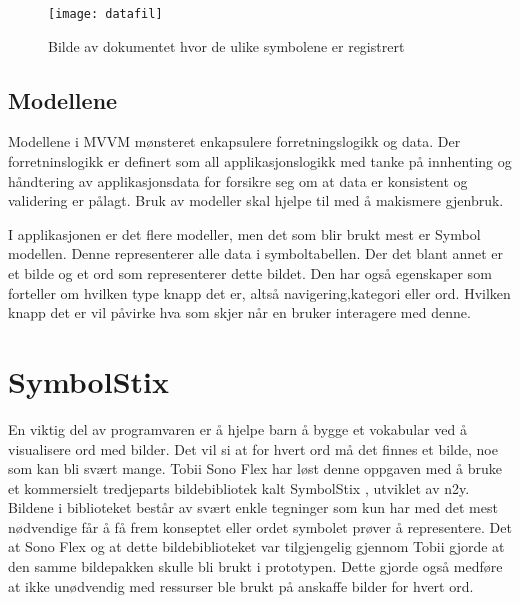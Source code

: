 {\begin{figure}[ht!] 
\centering 
\texttt{[image: datafil]} 
\caption{Bilde av dokumentet hvor de ulike symbolene er registrert} 
\label{fig:dok} 
\end{figure} 


\subsection{Modellene}

Modellene i MVVM mønsteret enkapsulere forretningslogikk og data. Der forretninslogikk er definert som all applikasjonslogikk med tanke på innhenting og håndtering av applikasjonsdata for forsikre seg om at data er konsistent og validering er pålagt. Bruk av modeller skal hjelpe til med å makismere gjenbruk.

I applikasjonen er det flere modeller, men det som blir brukt mest er Symbol modellen. Denne representerer alle data i symboltabellen. Der det blant annet er et bilde og et ord som representerer dette bildet. Den har også egenskaper som forteller om hvilken type knapp det er, altså navigering,kategori eller ord. Hvilken knapp det er vil påvirke hva som skjer når en bruker interagere med denne.












 
 
 
 

\section{SymbolStix} 
 
 
En viktig del av programvaren er å hjelpe barn å bygge et vokabular ved å visualisere ord med bilder. Det vil si at for hvert ord må det finnes et bilde, noe som kan bli svært mange. Tobii Sono Flex har løst denne oppgaven med å bruke et kommersielt tredjeparts bildebibliotek kalt SymbolStix \cite{n2y}, utviklet av n2y. Bildene i biblioteket består av svært enkle tegninger som kun har med det mest nødvendige får å få frem konseptet eller ordet symbolet prøver å representere. Det at Sono Flex og at dette bildebiblioteket var tilgjengelig gjennom Tobii gjorde at den samme bildepakken skulle bli brukt i prototypen. Dette gjorde også medføre at ikke unødvendig med ressurser ble brukt på anskaffe bilder for hvert ord. 
 
}
